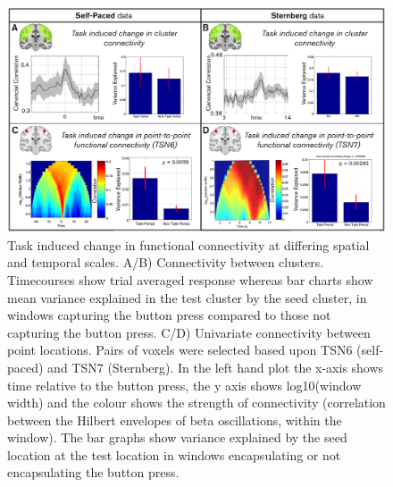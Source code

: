 	\begin{figure}[h]
		\begin{center}
			\includegraphics[width=\linewidth]{./images/chapter5/Figure_6.png}
			\caption{Task induced change in functional connectivity at differing spatial and temporal scales. A/B) Connectivity between clusters. Timecourses show trial averaged response whereas bar charts show mean variance explained in the test cluster by the seed cluster, in windows capturing the button press compared to those not capturing the button press. C/D) Univariate connectivity between point locations. Pairs of voxels were selected based upon TSN6 (self-paced) and TSN7 (Sternberg). In the left hand plot the x-axis shows time relative to the button press, the y axis shows log10(window width) and the colour shows the strength of connectivity (correlation between the Hilbert envelopes of beta oscillations, within the window). The bar graphs show variance explained by the seed location at the test location in windows encapsulating or not encapsulating the button press. \label{figure_5_6}}
		\end{center}
	\end{figure}
	
